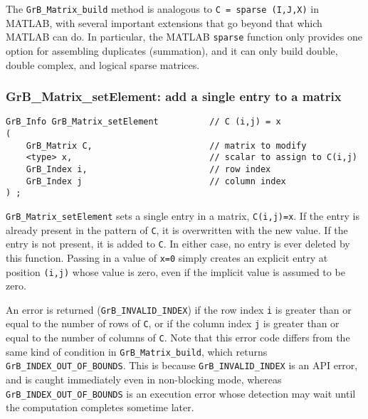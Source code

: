 \documentclass[12pt]{article}
\begin{document}
The \verb'GrB_Matrix_build' method is analogous to \verb'C = sparse (I,J,X)' in
MATLAB, with several important extensions that go beyond that which MATLAB can
do.  In particular, the MATLAB \verb'sparse' function only provides one option
for assembling duplicates (summation), and it can only build double, double
complex, and logical sparse matrices.

\newpage
\subsubsection{{\sf GrB\_Matrix\_setElement:}   add a single entry to a matrix}
\label{matrix_setElement}

\begin{mdframed}[userdefinedwidth=6in]
{\footnotesize
\begin{verbatim}
GrB_Info GrB_Matrix_setElement          // C (i,j) = x
(
    GrB_Matrix C,                       // matrix to modify
    <type> x,                           // scalar to assign to C(i,j)
    GrB_Index i,                        // row index
    GrB_Index j                         // column index
) ;
\end{verbatim} } \end{mdframed}

\verb'GrB_Matrix_setElement' sets a single entry in a matrix, \verb'C(i,j)=x'.
If the entry is already present in the pattern of \verb'C', it is overwritten
with the new value.  If the entry is not present, it is added to \verb'C'.  In
either case, no entry is ever deleted by this function.  Passing in a value of
\verb'x=0' simply creates an explicit entry at position \verb'(i,j)' whose
value is zero, even if the implicit value is assumed to be zero.

An error is returned (\verb'GrB_INVALID_INDEX') if the row index \verb'i' is
greater than or equal to the number of rows of \verb'C', or if the column index
\verb'j' is greater than or equal to the number of columns of \verb'C'.  Note
that this error code differs from the same kind of condition in
\verb'GrB_Matrix_build', which returns \verb'GrB_INDEX_OUT_OF_BOUNDS'.  This is
because \verb'GrB_INVALID_INDEX' is an API error, and is caught immediately
even in non-blocking mode, whereas \verb'GrB_INDEX_OUT_OF_BOUNDS' is an
execution error whose detection may wait until the computation completes
sometime later.
\end{document}
